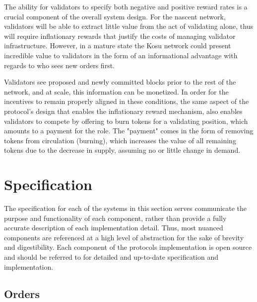 \documentclass[10pt]{article}
\begin{document}
The ability for validators to specify both negative and positive reward rates is a crucial component of the overall system design. For the nascent network, validators will be able to extract little value from the act of validating alone, thus will require inflationary rewards that justify the costs of managing validator infrastructure. However, in a mature state the Kosu network could present incredible value to validators in the form of an informational advantage with regards to who sees new orders first.
\medskip

Validators see proposed and newly committed blocks prior to the rest of the network, and at scale, this information can be monetized. In order for the incentives to remain properly aligned in these conditions, the same aspect of the protocol's design that enables the inflationary reward mechanism, also enables validators to compete by offering to burn tokens for a validating position, which amounts to a payment for the role. The "payment" comes in the form of removing tokens from circulation (burning), which increases the value of all remaining tokens due to the decrease in supply, assuming no or little change in demand.
\medskip
\clearpage
\pagebreak


\section{Specification}\label{specification}

The specification for each of the systems in this section serves communicate the purpose and functionality of each component, rather than provide a fully accurate description of each implementation detail. Thus, most nuanced components are referenced at a high level of abstraction for the sake of brevity and digestibility. Each component of the protocols implementation is open source\cite{paradigm-github} and should be referred to for detailed and up-to-date specification and implementation. 

\subsection{Orders}\label{orders}
\end{document}
